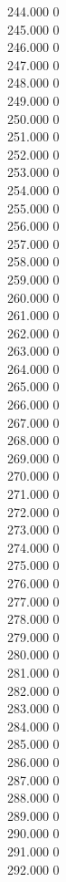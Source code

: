 { 244.000	0 \\
 245.000	0 \\
 246.000	0 \\
 247.000	0 \\
 248.000	0 \\
 249.000	0 \\
 250.000	0 \\
 251.000	0 \\
 252.000	0 \\
 253.000	0 \\
 254.000	0 \\
 255.000	0 \\
 256.000	0 \\
 257.000	0 \\
 258.000	0 \\
 259.000	0 \\
 260.000	0 \\
 261.000	0 \\
 262.000	0 \\
 263.000	0 \\
 264.000	0 \\
 265.000	0 \\
 266.000	0 \\
 267.000	0 \\
 268.000	0 \\
 269.000	0 \\
 270.000	0 \\
 271.000	0 \\
 272.000	0 \\
 273.000	0 \\
 274.000	0 \\
 275.000	0 \\
 276.000	0 \\
 277.000	0 \\
 278.000	0 \\
 279.000	0 \\
 280.000	0 \\
 281.000	0 \\
 282.000	0 \\
 283.000	0 \\
 284.000	0 \\
 285.000	0 \\
 286.000	0 \\
 287.000	0 \\
 288.000	0 \\
 289.000	0 \\
 290.000	0 \\
 291.000	0 \\
 292.000	0 \\
}
